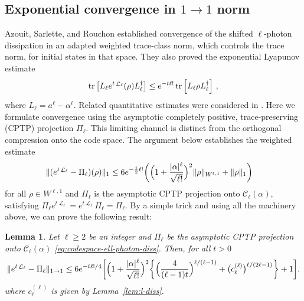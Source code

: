 \documentclass[11pt]{article}
\theoremstyle{myplain}
\newtheorem{lem}[lem]{Lemma}
\theoremstyle{mydefinition}
\theoremstyle{remark}
\DeclareMathOperator{\cL}{\mathcal{L}}
\DeclareMathOperator{\1}{\mathds{1}}
\newcommand{\tr}[1][]{\operatorname{tr}%
  \ifx#1\empty \else \left[ #1 \right] \fi}
\begin{document}
    \subsection{Exponential convergence in $1\rightarrow1$ norm }\label{subsec:exp-convergence}
        Azouit, Sarlette, and Rouchon \cite[Thm.~2]{Azouit.2016} established convergence of the shifted $\ell$-photon dissipation in an adapted weighted trace-class norm, which controls the trace norm, for initial states in that space. They also proved the exponential Lyapunov estimate
        \begin{equation*}
            \tr\big[L_\ell e^{t\cL_\ell}(\rho)L_\ell^\dagger\big] \leq e^{-t\ell!} \tr[L_\ell\rho L_\ell^\dagger]\,,
        \end{equation*}
        where $L_\ell=a^\ell-\alpha^\ell$. Related quantitative estimates were considered in \cite[Prop.~A.2]{Moebus.2025}. Here we formulate convergence using the asymptotic completely positive, trace-preserving (CPTP) projection $\Pi_\ell$. This limiting channel is distinct from the orthogonal compression onto the code space. The argument below establishes the weighted estimate
        \begin{equation*}
            \begin{aligned}
                \|(e^{t\cL_\ell} - \Pi_\ell)(\rho)\|_1 &\leq 6e^{- \frac{t}{2} \ell!}\biggl( \Bigl(1 + \frac{|\alpha|^\ell}{\sqrt{\ell!}}\Bigr)^2\|\rho \|_{W^{\ell,1}} + \|\rho\|_1 \biggr)
            \end{aligned}
        \end{equation*}
        for all $\rho \in W^{\ell,1}$ and $\Pi_\ell$ is the asymptotic CPTP projection onto $\mathcal{C}_\ell(\alpha)$, satisfying $\Pi_\ell e^{t\cL_\ell}=e^{t\cL_\ell}\Pi_\ell=\Pi_\ell$. By a simple trick and using all the machinery above, we can prove the following result:
        \begin{lem}\label{lem:cat-convergence}
            Let $\ell \geq 2$ be an integer and $\Pi_\ell$ be the asymptotic CPTP projection onto $\mathcal{C}_\ell(\alpha)$ \eqref{eq:codespace-ell-photon-diss}. Then, for all $t>0$
            \begin{equation*}
                \begin{aligned}
                    \|e^{t\cL_\ell}-\Pi_\ell\|_{1\to1}
                    \leq6e^{-t\ell!/4}\biggl[\Bigl(1+\frac{|\alpha|^\ell}{\sqrt{\ell!}}\Bigr)^2
                    \biggl\{\Bigl(\frac4{(\ell-1)t}\Bigr)^{\ell/(\ell-1)}
                    +\bigl(c_\ell^{(\ell)}\bigr)^{\ell/(2\ell-1)}\biggr\}+1\biggr].
                \end{aligned}
            \end{equation*}
            where $c_\ell^{(\ell)}$ is given by Lemma~\ref{lem:l-diss}.
        \end{lem}
\end{document}
